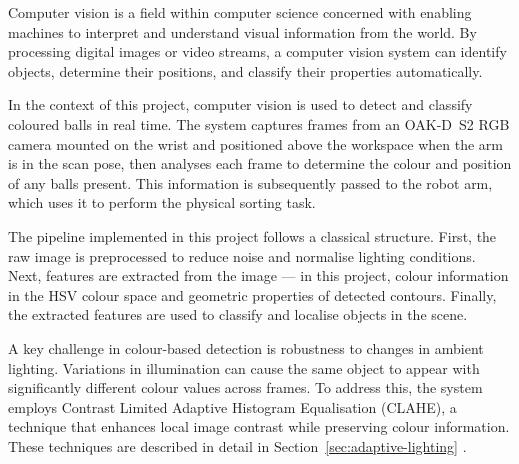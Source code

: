 \label{sec:computer-vision}

Computer vision is a field within computer science concerned with enabling machines to interpret and understand visual information from the world. By processing digital images or video streams, a computer vision system can identify objects, determine their positions, and classify their properties automatically.

In the context of this project, computer vision is used to detect and classify coloured balls in real time. The system captures frames from an OAK-D~S2 RGB camera mounted on the wrist and positioned above the workspace when the arm is in the scan pose, then analyses each frame to determine the colour and position of any balls present. This information is subsequently passed to the robot arm, which uses it to perform the physical sorting task.

The pipeline implemented in this project follows a classical structure. First, the raw image is preprocessed to reduce noise and normalise lighting conditions. Next, features are extracted from the image — in this project, colour information in the HSV colour space and geometric properties of detected contours. Finally, the extracted features are used to classify and localise objects in the scene.

A key challenge in colour-based detection is robustness to changes in ambient lighting. Variations in illumination can cause the same object to appear with significantly different colour values across frames. To address this, the system employs Contrast Limited Adaptive Histogram
Equalisation (CLAHE), a technique that enhances local image contrast while
preserving colour information. These techniques are described in detail in
Section~\ref{sec:adaptive-lighting} \cite{bradski2008learning}.
